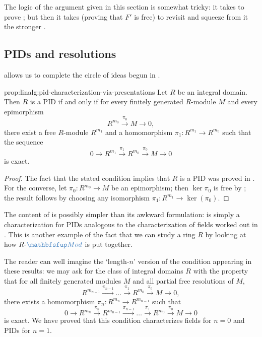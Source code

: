 The logic of the argument given in this section is somewhat tricky: it
takes  to prove ; but then it takes
 (proving that $F'$ is free) to revisit
 and squeeze from it the stronger .

\subsection{PIDs and resolutions}
\label{subsec:linalg:pids-and-resolutions}
 allows us to complete the circle of ideas begun in
.
\begin{prop}{}{prop:linalg:pid-characterization-via-presentations}
  Let $R$ be an integral domain. Then $R$ is a PID if and only if for
  every finitely generated $R$-module $M$ and every epimorphism
  \[
    R^{m_0} \xrightarrow{\pi_0} M \to 0,
  \]
  there exist a free $R$-module $R^{m_1}$ and a homomorphism
  $\pi_1 : R^{m_1} \to R^{m_0}$ such that the sequence
  \[
    0 \to R^{m_1} \xrightarrow{\pi_1} R^{m_0} \xrightarrow{\pi_0} M
    \to 0
  \]
  is exact.
\end{prop}
\begin{proof}
  The fact that the stated condition implies that $R$ is a PID was
  proved in . For the converse, let
  $\pi_0 : R^{m_0} \to M$ be an epimorphism; then $\ker\pi_0$ is free
  by ; the result follows by choosing any isomorphism
  $\pi_1 : R^{m_1} \to \ker(\pi_0)$.
\end{proof}

The content of  is possibly simpler than its awkward
formulation:  is simply a characterization for PIDs
analogous to the characterization of fields worked out in
. This is another example of the fact that we can
study a ring $R$ by looking at how $R$-$\categ{Mod}$ is put together.

The reader can well imagine the `length-$n$' version of the condition
appearing in these results: we may ask for the class of integral
domains $R$ with the property that for all finitely generated modules
$M$ and all partial free resolutions of $M$,
\[
  R^{m_{n-1}} \xrightarrow{\pi_{n-1}} \dots \xrightarrow{\pi_1}
  R^{m_0} \xrightarrow{\pi_0} M \to 0,
\]
there exists a homomorphism $\pi_n : R^{m_n} \to R^{m_{n-1}}$ such
that
\[
  0 \to R^{m_n} \xrightarrow{\pi_n} R^{m_{n-1}}
  \xrightarrow{\pi_{n-1}} \dots \xrightarrow{\pi_1} R^{m_0}
  \xrightarrow{\pi_0} M \to 0
\]
is exact. We have proved that this condition characterizes fields for
$n = 0$ and PIDs for $n = 1$.

